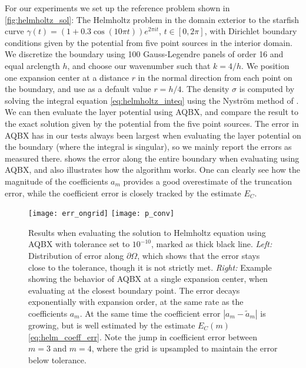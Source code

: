 \documentclass[hidelinks]{siamart1116}
\begin{document}
For our experiments we set up the reference problem shown in
\cref{fig:helmholtz_sol}: The Helmholtz problem in the domain exterior
to the starfish curve $\gamma(t) = (1+0.3\cos(10 \pi t))e^{2\pi i t}$,
$t\in[0,2\pi]$, with Dirichlet boundary conditions given by the
potential from five point sources in the interior domain. We
discretize the boundary using 100 Gauss-Legendre panels of order 16
and equal arclength $h$, and choose our wavenumber such that
${{k}}=4/h$. We position one expansion center at a distance $r$ in the
normal direction from each point on the boundary, and use as a default
value $r=h/4$. The density ${\sigma}$ is computed by solving the integral
equation \eqref{eq:helmholtz_inteq} using the Nystr\"om method of
\cite{Helsing2015}. We can then evaluate the layer potential using
AQBX, and compare the result to the exact solution given by the
potential from the five point sources. The error in AQBX has in our
tests always been largest when evaluating the layer potential on the
boundary (where the integral is singular), so we mainly report the
errors as measured there.  shows the error along the
entire boundary when evaluating using AQBX, and also illustrates how
the algorithm works. One can clearly see how the magnitude of the
coefficients $a_m$ provides a good overestimate of the truncation
error, while the coefficient error is closely tracked by the estimate
${E_C}$.
\begin{figure}[htbp]
  
  \centering
  \tikzset{font=\footnotesize} 
  \tikzset{mark size=1/2}
  \texttt{[image: err\_ongrid]}
  \tikzset{mark size=2}
  \texttt{[image: p\_conv]}
  \caption{Results when evaluating the solution to Helmholtz equation
    using AQBX with tolerance set to $10^{-10}$, marked as thick black
    line. \emph{Left:} Distribution of error along ${{\partial\Omega}}$, which
    shows that the error stays close to the tolerance, though it is
    not strictly met. \emph{Right:} Example showing the behavior of
    AQBX at a single expansion center, when evaluating at the closest
    boundary point. The error decays exponentially with expansion
    order, at the same rate as the coefficients $a_m$.  At the same
    time the coefficient error $|a_m - \tilde a_m|$ is growing, but is
    well estimated by the estimate ${E_C}(m)$ \eqref{eq:helm_coeff_err}.
    Note the jump in coefficient error between $m=3$ and $m=4$, where
    the grid is upsampled to maintain the error below tolerance.}
  \label{fig:error}
\end{figure}
\end{document}
